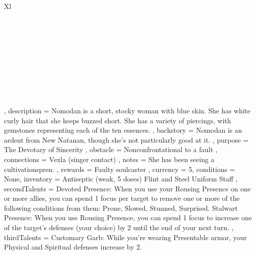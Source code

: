\documentclass[article,stormlight]{plotweaver}
\begin{document}
{{\begin{NiceTabularX}{\linewidth}{Xl}
                \GoalRow[Soulcasting][2] \\
                \GoalRow \\
                \GoalRow \\
                \GoalRow \\
                \GoalRow \\
                \GoalRow \\
                \GoalRow \\
                \GoalRow \\
                \GoalRow \\
                \GoalRow \\
            \end{NiceTabularX}
        },
        description = {
            Nomodan is a short, stocky woman with blue skin. She has white curly hair that she keeps buzzed short. She has a variety of piercings, with gemstones representing each of the ten essences.
        },
        backstory = {
            Nomodan is an ardent from New Natanan, though she's not particularly good at it.
        },
        purpose = {
            The Devotary of Sincerity
        },
        obstacle = {
            Nonconfrontational to a fault
        },
        connections = {
            Vexla (singer contact)
        },
        notes = {
            She has been seeing a cultivationspren.
        },
        rewards = {
            Faulty soulcaster
        },
        currency = {\Huge5},
        conditions = None,
        inventory = {
            Antiseptic (weak, 5 doses)
            \newline
            Flint and Steel
            \newline
            Uniform
            \newline
            Staff
        },
        secondTalents = {
            \key Devoted Presence: When you use your Rousing Presence on one or more allies, you can spend 1 focus per target to remove one or more of the following conditions from them: Prone, Slowed, Stunned, Surprised.
            \bigskip\newline
            \key Stalwart Presence: When you use Rousing Presence, you can spend 1 focus to increase one of the target's defenses (your choice) by 2 until the end of your next turn.
        },
        thirdTalents = {
            \forever Customary Garb: While you're wearing Presentable armor, your Physical and Spiritual defenses increase by 2.
        }
    }
\end{document}
